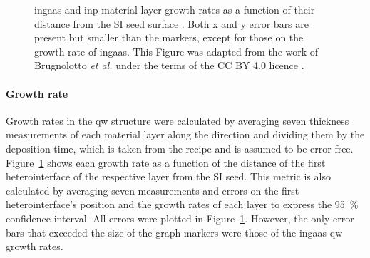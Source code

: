 \begin{figure}
    \centering
    \caption[\acs{ingaas} and \acs{inp} material layer growth rates as a function of their distance from the \acs{SI} seed surface in sample 6.]{\acs{ingaas} and \acs{inp} material layer growth rates as a function of their distance from the \acs{SI} seed surface \cite{Brugnolotto2023_2}. Both x and y error bars are present but smaller than the markers, except for those on the growth rate of \acs{ingaas}. This Figure was adapted from the work of Brugnolotto \textit{et al.} \cite{Brugnolotto2023_2} under the terms of the CC BY 4.0 licence \cite{CCBY40}.}
    \label{fig:s6_growth_rates}
\end{figure}

\paragraph{Growth rate} Growth rates in the \acl{qw} structure were calculated by averaging seven thickness measurements of each material layer along the  direction and dividing them by the deposition time, which is taken from the recipe and is assumed to be error-free. Figure~\ref{fig:s6_growth_rates} shows each growth rate as a function of the distance of the first heterointerface of the respective layer from the \acl{SI} seed. This metric is also calculated by averaging seven measurements and errors on the first heterointerface's position and the growth rates of each layer to express the \qty{95}{\%} confidence interval. All errors were plotted in Figure~\ref{fig:s6_growth_rates}. However, the only error bars that exceeded the size of the graph markers were those of the \acs{ingaas} \acl{qw} growth rates.


